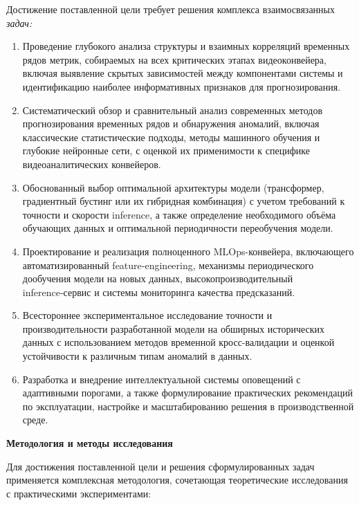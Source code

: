 \hspace*{1.25cm}Достижение поставленной цели требует решения комплекса взаимосвязанных \textit{задач:}

\begin{enumerate}
	\item Проведение глубокого анализа структуры и взаимных корреляций временных рядов метрик, собираемых на всех критических этапах видеоконвейера, включая выявление скрытых зависимостей между компонентами системы и идентификацию наиболее информативных признаков для прогнозирования.
	\item Систематический обзор и сравнительный анализ современных методов прогнозирования временных рядов и обнаружения аномалий, включая классические статистические подходы, методы машинного обучения и глубокие нейронные сети, с оценкой их применимости к специфике видеоаналитических конвейеров.
	\item Обоснованный выбор оптимальной архитектуры модели (трансформер, градиентный бустинг или их гибридная комбинация) с учетом требований к точности и скорости inference, а также определение необходимого объёма обучающих данных и оптимальной периодичности переобучения модели.
	\item Проектирование и реализация полноценного MLOps-конвейера, включающего автоматизированный feature‑engineering, механизмы периодического дообучения модели на новых данных, высокопроизводительный inference‑сервис и системы мониторинга качества предсказаний.
	\item Всестороннее экспериментальное исследование точности и производительности разработанной модели на обширных исторических данных с использованием методов временной кросс-валидации и оценкой устойчивости к различным типам аномалий в данных.
	\item Разработка и внедрение интеллектуальной системы оповещений с адаптивными порогами, а также формулирование практических рекомендаций по эксплуатации, настройке и масштабированию решения в производственной среде.
\end{enumerate}

\textbf{Методология и методы исследования}

\hspace*{1.25cm}Для достижения поставленной цели и решения сформулированных задач применяется комплексная методология, сочетающая теоретические исследования с практическими экспериментами:

